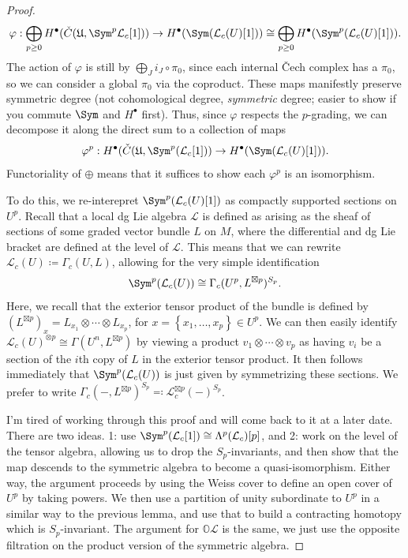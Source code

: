 \begin{proof}
	\[
		\varphi : \bigoplus_{p\geq 0} H^{\bullet} (\check{C}(\mathfrak{U}, \Sym ^p\mathcal{L} _c[1])) \to H^{\bullet} (\Sym (\mathcal{L} _c(U)[1]))\cong \bigoplus_{p\geq 0} H^{\bullet} (\Sym^p(\mathcal{L} _c(U)[1]))
	.\]
	The action of $\varphi $ is still by $\bigoplus_{J} i_J \circ \pi _0$, since each internal \v{C}ech complex has a $\pi _0$, so we can consider a global $\pi _0$ via the coproduct. These maps manifestly preserve symmetric degree (not cohomological degree, \emph{symmetric} degree; easier to show if you commute $\Sym $ and $H^{\bullet} $ first). Thus, since $\varphi $ respects the $p$-grading, we can decompose it along the direct sum to a collection of maps
	\[
		\varphi ^p : H^{\bullet} (\check{C}(\mathfrak{U} ,\Sym ^p(\mathcal{L} _c[1])) \to H^{\bullet} (\Sym(\mathcal{L} _c(U)[1]))
	.\]
	Functoriality of $\oplus $ means that it suffices to show each $\varphi ^p$ is an isomorphism. 

	To do this, we re-interepret $\Sym ^p(\mathcal{L} _c(U)[1])$ as compactly supported sections on $U^p$. Recall that a local dg Lie algebra $\mathcal{L} $ is defined as arising as the sheaf of sections of some graded vector bundle $L$ on $M$, where the differential and dg Lie bracket are defined at the level of $\mathcal{L} $. This means that we can rewrite $\mathcal{L} _c(U) \coloneqq \Gamma _c(U,L)$, allowing for the very simple identification
	\[
		\Sym ^p(\mathcal{L} _c(U)) \cong \Gamma _c(U^p,L^{\boxtimes p} )^{S_p} 
	.\]
	Here, we recall that the exterior tensor product of the bundle is defined by $(L^{\boxtimes p} )_{x}  = L_{x_1} \otimes \cdots \otimes L_{x_p} $, for $x=\left\{ x_1, \ldots ,x_p \right\} \in U^p$. We can then easily identify $\mathcal{L} _c(U)^{\otimes p} \cong \Gamma (U^n,L^{\boxtimes p} )$ by viewing a product $v_1 \otimes \cdots \otimes v_p$ as having $v_i$ be a section of the $i$th copy of $L$ in the exterior tensor product. It then follows immediately that $\Sym ^p(\mathcal{L} _c(U))$ is just given by symmetrizing these sections. We prefer to write $\Gamma_c(-,L^{\boxtimes p} )^{S_p} \eqqcolon \mathcal{L} ^{\boxtimes p}_c(-)^{S_p} $.

	I'm tired of working through this proof and will come back to it at a later date. There are two ideas. 1: use $\Sym ^p(\mathcal{L} _c[1]) \cong \Lambda ^p(\mathcal{L} _c)[p]$, and 2: work on the level of the tensor algebra, allowing us to drop the $S_p$-invariants, and then show that the map descends to the symmetric algebra to become a quasi-isomorphism. Either way, the argument proceeds by using the Weiss cover to define an open cover of $U^p$ by taking powers. We then use a partition of unity subordinate to $U^p$ in a similar way to the previous lemma, and use that to build a contracting homotopy which is $S_p$-invariant. The argument for $\mathbb{O} \mathcal{L} $ is the same, we just use the opposite filtration on the product version of the symmetric algebra.
\end{proof}



